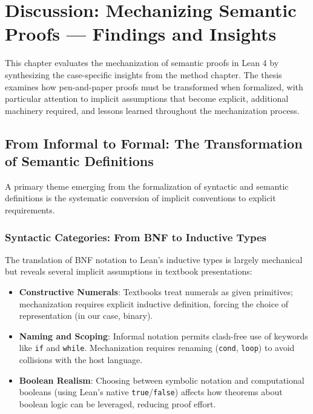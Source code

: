 
%
%
%
%
%
%
\chapter{Discussion: Mechanizing Semantic Proofs — Findings and Insights}

This chapter evaluates the mechanization of semantic proofs in Lean 4 by synthesizing the case-specific insights from the method chapter. The thesis examines how pen-and-paper proofs must be transformed when formalized, with particular attention to implicit assumptions that become explicit, additional machinery required, and lessons learned throughout the mechanization process.

%
%
%
\section{From Informal to Formal: The Transformation of Semantic Definitions}
\label{discussion:sec:transformation}

A primary theme emerging from the formalization of syntactic and semantic
definitions is the systematic conversion of implicit conventions to explicit
requirements.

\subsection*{Syntactic Categories: From BNF to Inductive Types}

The translation of BNF notation to Lean's inductive types is largely
mechanical but reveals several implicit assumptions in textbook presentations:

\begin{itemize}
    \item \textbf{Constructive Numerals}:
    Textbooks treat numerals as given
    primitives; mechanization requires explicit inductive definition,
    forcing the choice of representation (in our case, binary).

    \item \textbf{Naming and Scoping}:
    Informal notation permits clash-free
    use of keywords like \texttt{if} and \texttt{while}. Mechanization
    requires renaming (\texttt{cond}, \texttt{loop}) to avoid collisions
    with the host language.

    \item \textbf{Boolean Realism}:
    Choosing between symbolic notation and
    computational booleans (using Lean's native \texttt{true}/\texttt{false})
    affects how theorems about boolean logic can be leveraged, reducing
    proof effort.
\end{itemize}

